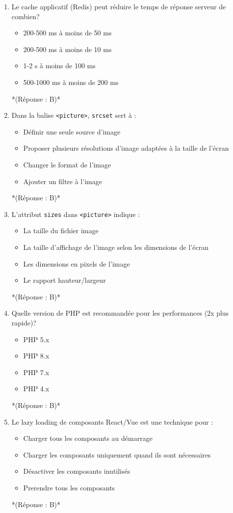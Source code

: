 \documentclass[12pt,a4paper,twoside]{report}
\begin{document}
\begin{enumerate}
\item Le cache applicatif (Redis) peut réduire le temps de réponse serveur de combien?
\begin{itemize}
\item[A)] 200-500 ms à moins de 50 ms
\item[B)] 200-500 ms à moins de 10 ms
\item[C)] 1-2 s à moins de 100 ms
\item[D)] 500-1000 ms à moins de 200 ms
\end{itemize}
*(Réponse : B)*

\item Dans la balise \texttt{<picture>}, \texttt{srcset} sert à :
\begin{itemize}
\item[A)] Définir une seule source d'image
\item[B)] Proposer plusieurs résolutions d'image adaptées à la taille de l'écran
\item[C)] Changer le format de l'image
\item[D)] Ajouter un filtre à l'image
\end{itemize}
*(Réponse : B)*

\item L'attribut \texttt{sizes} dans \texttt{<picture>} indique :
\begin{itemize}
\item[A)] La taille du fichier image
\item[B)] La taille d'affichage de l'image selon les dimensions de l'écran
\item[C)] Les dimensions en pixels de l'image
\item[D)] Le rapport hauteur/largeur
\end{itemize}
*(Réponse : B)*

\item Quelle version de PHP est recommandée pour les performances (2x plus rapide)?
\begin{itemize}
\item[A)] PHP 5.x
\item[B)] PHP 8.x
\item[C)] PHP 7.x
\item[D)] PHP 4.x
\end{itemize}
*(Réponse : B)*

\item Le lazy loading de composants React/Vue est une technique pour :
\begin{itemize}
\item[A)] Charger tous les composants au démarrage
\item[B)] Charger les composants uniquement quand ils sont nécessaires
\item[C)] Désactiver les composants inutilisés
\item[D)] Prerendre tous les composants
\end{itemize}
*(Réponse : B)*


\end{enumerate}
\end{document}
